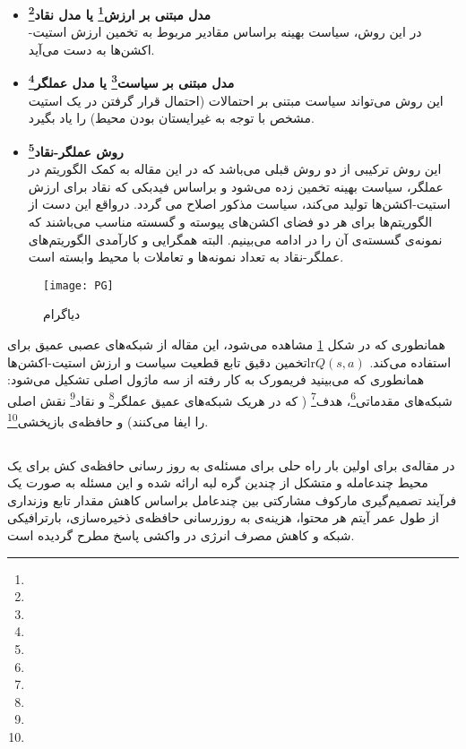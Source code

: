\begin{itemize}
	\item \textbf{مدل مبتنی بر ارزش\footnote{} یا مدل نقاد\footnote{}}\\
	در این روش، سیاست بهینه براساس مقادیر مربوط به تخمین ارزش استیت-اکشن‌ها  به دست می‌آید. 
	\item \textbf{مدل مبتنی بر سیاست\footnote{} یا مدل عملگر\footnote{}}\\
	این روش می‌تواند سیاست مبتنی بر احتمالات (احتمال قرار گرفتن در یک استیت مشخص با توجه به غیرایستان بودن محیط)  را یاد بگیرد.
	
	\item \textbf{روش عملگر-نقاد\footnote{}}\\
	این روش ترکیبی از دو روش قبلی می‌باشد که در این مقاله به کمک الگوریتم  در عملگر، سیاست بهینه تخمین زده می‌شود و براساس فیدبکی که نقاد برای ارزش استیت-اکشن‌ها تولید می‌کند، سیاست مذکور اصلاح می گردد. درواقع این دست از الگوریتم‌ها برای هر دو فضای اکشن‌های پیوسته و گسسته مناسب می‌باشند که نمونه‌ی گسسته‌ی آن را در ادامه می‌بینیم. البته همگرایی و کارآمدی الگوریتم‌های عملگر-نقاد به تعداد نمونه‌ها و تعاملات با محیط وابسته است.
	
\end{itemize}

\begin{figure}[ht]
	\centerline{\texttt{[image: PG]}}
	\caption{دیاگرام }
	\label{fig:PG}
\end{figure}

 همانطوری که در شکل \ref{fig:PG} مشاهده می‌شود، این مقاله از شبکه‌های عصبی عمیق برای تخمین دقیق تابع قطعیت سیاست و ارزش استیت-اکشن‌هاlr{$Q(s, a)$} استفاده می‌کند. همانطوری که می‌بینید فریمورک به کار رفته از سه ماژول اصلی تشکیل می‌شود: شبکه‌های مقدماتی\footnote{}، هدف\footnote{} ( که در هریک شبکه‌های عمیق عملگر\footnote{} و نقاد\footnote{} نقش اصلی را ایفا می‌کنند) و حافظه‌ی بازپخشی\footnote{}.

\subsection{}
در مقاله‌ی \cite{wu2021caching} برای اولین بار راه حلی برای مسئله‌ی به روز رسانی حافظه‌ی کش برای یک محیط چندعامله و متشکل از چندین گره لبه ارائه شده و این مسئله به صورت یک فرآیند تصمیم‌گیری مارکوف مشارکتی بین چندعامل براساس کاهش مقدار تابع وزنداری از طول عمر آیتم هر محتوا، هزینه‌ی به روزرسانی حافظه‌ی ذخیره‌سازی، بارترافیکی شبکه و کاهش مصرف انرژی در واکشی پاسخ مطرح گردیده است. 

